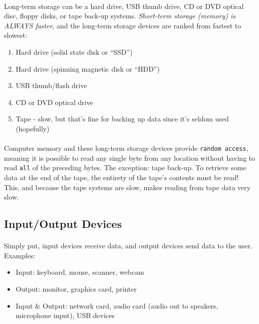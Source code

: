 \documentclass[letter,10pt]{article}
\begin{document}
\paragraph{}Long-term storage can be a hard drive, USB thumb drive, CD or DVD optical disc, floppy disks, or tape back-up systems. \textit{Short-term storage (memory) is ALWAYS faster}, and the long-term storage devices are ranked from fastest to slowest:
\begin{enumerate}
    \item Hard drive (solid state disk or ``SSD'')
    \item Hard drive (spinning magnetic disk or ``HDD'')
    \item USB thumb/flash drive
    \item CD or DVD optical drive
    \item Tape - slow, but that's fine for backing up data since it's seldom used (hopefully)
\end{enumerate}

\paragraph{}Computer memory and these long-term storage devices provide \texttt{random access}, meaning it is possible to read any single byte from any location without having to read \texttt{all} of the preceding bytes. The exception: tape back-up. To retrieve some data at the end of the tape, the entirety of the tape's contents must be read! This, and because the tape systems are slow, makes reading from tape data very slow.

\subsection{Input/Output Devices}
\paragraph{}Simply put, input devices receive data, and output devices send data to the user. Examples:
\begin{itemize}
    \item Input: keyboard, mouse, scanner, webcam
    \item Output: monitor, graphics card, printer
    \item Input \& Output: network card, audio card (audio out to speakers, microphone input), USB devices
\end{itemize}
\end{document}
